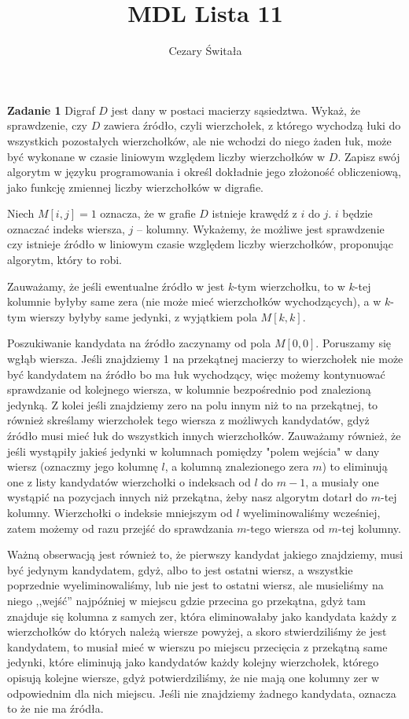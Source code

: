 \documentclass[12pt,a4paper]{article}
\title{MDL Lista 11}
\author{Cezary Świtała}
\begin{document}
\maketitle

\noindent
\textbf{Zadanie 1} Digraf \(D\) jest dany w postaci macierzy sąsiedztwa. Wykaż, że sprawdzenie, czy
\(D\) zawiera źródło, czyli wierzchołek, z którego wychodzą łuki do wszystkich pozostałych
wierzchołków, ale nie wchodzi do niego żaden łuk, może być wykonane w czasie liniowym względem
liczby wierzchołków w \(D\). Zapisz swój algorytm w języku programowania i określ dokładnie jego
złożoność obliczeniową, jako funkcję zmiennej liczby wierzchołków w digrafie.
\vskip 0.2cm

Niech \(M[i,j] = 1\) oznacza, że w grafie \(D\) istnieje krawędź z \(i\) do \(j\). \(i\) będzie oznaczać indeks wiersza, \(j\) -- kolumny. Wykażemy, że możliwe jest sprawdzenie czy istnieje źródło w liniowym czasie względem liczby wierzchołków, proponując algorytm, który to robi.

Zauważamy, że jeśli ewentualne źródło w jest \(k\)-tym wierzchołku, to w \(k\)-tej kolumnie byłyby same zera (nie może mieć wierzchołków wychodzących), a w \(k\)-tym wierszy byłyby same jedynki, z wyjątkiem pola \(M[k,k]\).

Poszukiwanie kandydata na źródło zaczynamy od pola \(M[0,0]\). Poruszamy się wgłąb wiersza. Jeśli znajdziemy 1 na przekątnej macierzy to wierzchołek nie może być kandydatem na źródło bo ma łuk wychodzący, więc możemy kontynuować sprawdzanie od kolejnego wiersza, w kolumnie bezpośrednio pod znalezioną jedynką. Z kolei jeśli znajdziemy zero na polu innym niż to na przekątnej, to również skreślamy wierzchołek tego wiersza z możliwych kandydatów, gdyż źródło musi mieć łuk do wszystkich innych wierzchołków. Zauważamy również, że jeśli wystąpiły jakieś jedynki w kolumnach pomiędzy "polem wejścia" w dany wiersz (oznaczmy jego kolumnę \(l\), a kolumną znalezionego zera \(m\)) to eliminują one z listy kandydatów wierzchołki o indeksach od \(l\) do \(m-1\), a musiały one wystąpić na pozycjach innych niż przekątna, żeby nasz algorytm dotarł do \(m\)-tej kolumny. Wierzchołki o indeksie mniejszym od \(l\) wyeliminowaliśmy wcześniej, zatem możemy od razu przejść do sprawdzania \(m\)-tego wiersza od \(m\)-tej kolumny.

Ważną obserwacją jest również to, że pierwszy kandydat jakiego znajdziemy, musi być jedynym kandydatem, gdyż, albo to jest ostatni wiersz, a wszystkie poprzednie wyeliminowaliśmy, lub nie jest to ostatni wiersz, ale musieliśmy na niego ,,wejść'' najpóźniej w miejscu gdzie przecina go przekątna, gdyż tam znajduje się kolumna z samych zer, która eliminowałaby jako kandydata każdy z wierzchołków do których należą wiersze powyżej, a skoro stwierdziliśmy że jest kandydatem, to musiał mieć w wierszu po miejscu przecięcia z przekątną same jedynki, które eliminują jako kandydatów każdy kolejny wierzchołek, którego opisują kolejne wiersze, gdyż potwierdziliśmy, że nie mają one kolumny zer w odpowiednim dla nich miejscu. Jeśli nie znajdziemy żadnego kandydata, oznacza to że nie ma źródła.
\end{document}
